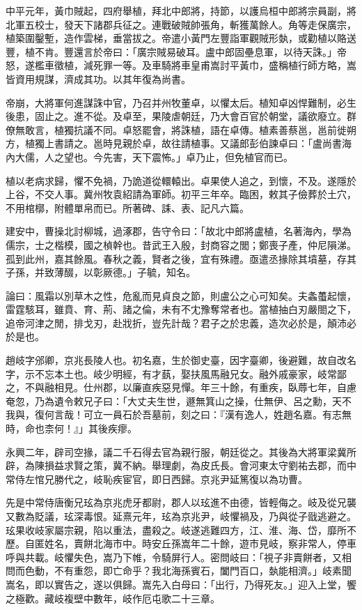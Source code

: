 \begin{pinyinscope}
中平元年，黃巾賊起，四府舉植，拜北中郎將，持節，以護烏桓中郎將宗員副，將北軍五校士，發天下諸郡兵征之。連戰破賊帥張角，斬獲萬餘人。角等走保廣宗，植築圍鑿塹，造作雲梯，垂當拔之。帝遣小黃門左豐詣軍觀賊形埶，或勸植以賂送豐，植不肯。豐還言於帝曰：「廣宗賊易破耳。盧中郎固壘息軍，以待天誅。」帝怒，遂檻車徵植，減死罪一等。及車騎將車皇甫嵩討平黃巾，盛稱植行師方略，嵩皆資用規謀，濟成其功。以其年復為尚書。

帝崩，大將軍何進謀誅中官，乃召并州牧董卓，以懼太后。植知卓凶悍難制，必生後患，固止之。進不從。及卓至，果陵虐朝廷，乃大會百官於朝堂，議欲廢立。群僚無敢言，植獨抗議不同。卓怒罷會，將誅植，語在卓傳。植素善蔡邕，邕前徙朔方，植獨上書請之。邕時見親於卓，故往請植事。又議郎彭伯諫卓曰：「盧尚書海內大儒，人之望也。今先害，天下震怖。」卓乃止，但免植官而已。

植以老病求歸，懼不免禍，乃詭道從轘轅出。卓果使人追之，到懷，不及。遂隱於上谷，不交人事。冀州牧袁紹請為軍師。初平三年卒。臨困，敕其子儉葬於土穴，不用棺槨，附體單帛而已。所著碑、誄、表、記凡六篇。

建安中，曹操北討柳城，過涿郡，告守令曰：「故北中郎將盧植，名著海內，學為儒宗，士之楷模，國之楨幹也。昔武王入殷，封商容之閭；鄭喪子產，仲尼隕涕。孤到此州，嘉其餘風。春秋之義，賢者之後，宜有殊禮。亟遣丞掾除其墳墓，存其子孫，并致薄醊，以彰厥德。」子毓，知名。

論曰：風霜以別草木之性，危亂而見貞良之節，則盧公之心可知矣。夫螽蠆起懷，雷霆駭耳，雖賁、育、荊、諸之倫，未有不冘豫奪常者也。當植抽白刃嚴閤之下，追帝河津之閒，排戈刃，赴戕折，豈先計哉？君子之於忠義，造次必於是，顛沛必於是也。

趙岐字邠卿，京兆長陵人也。初名嘉，生於御史臺，因字臺卿，後避難，故自改名字，示不忘本土也。岐少明經，有才蓺，娶扶風馬融兄女。融外戚豪家，岐常鄙之，不與融相見。仕州郡，以廉直疾惡見憚。年三十餘，有重疾，臥蓐七年，自慮奄忽，乃為遺令敕兄子曰：「大丈夫生世，遯無箕山之操，仕無伊、呂之勳，天不我與，復何言哉！可立一員石於吾墓前，刻之曰：『漢有逸人，姓趙名嘉。有志無時，命也柰何！』」其後疾瘳。

永興二年，辟司空掾，議二千石得去官為親行服，朝廷從之。其後為大將軍梁冀所辟，為陳損益求賢之策，冀不納。舉理劇，為皮氏長。會河東太守劉祐去郡，而中常侍左悺兄勝代之，岐恥疾宦官，即日西歸。京兆尹延篤復以為功曹。

先是中常侍唐衡兄玹為京兆虎牙都尉，郡人以玹進不由德，皆輕侮之。岐及從兄襲又數為貶議，玹深毒恨。延熹元年，玹為京兆尹，岐懼禍及，乃與從子戩逃避之。玹果收岐家屬宗親，陷以重法，盡殺之。岐遂逃難四方，江、淮、海、岱，靡所不歷。自匿姓名，賣餅北海市中。時安丘孫嵩年二十餘，遊市見岐，察非常人，停車呼與共載。岐懼失色，嵩乃下帷，令騎屏行人。密問岐曰：「視子非賣餅者，又相問而色動，不有重怨，即亡命乎？我北海孫賓石，闔門百口，埶能相濟。」岐素聞嵩名，即以實告之，遂以俱歸。嵩先入白母曰：「出行，乃得死友。」迎入上堂，饗之極歡。藏岐複壁中數年，岐作厄屯歌二十三章。


\end{pinyinscope}
